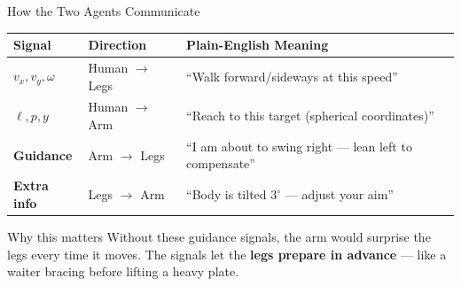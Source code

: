 \documentclass[10pt,aspectratio=169]{beamer}
\newenvironment{keybox}[1][Key Insight]{%
  \begin{exampleblock}{#1}}{\end{exampleblock}}
\begin{document}
\begin{frame}{How the Two Agents Communicate}
  \small
  \begin{table}
    \centering
    \begin{tabular}{>{\bfseries}l l p{6.2cm}}
      \toprule
      Signal & Direction & Plain-English Meaning \\
      \midrule
      $v_x, v_y, \omega$ & Human $\to$ Legs &
        ``Walk forward/sideways at this speed'' \\[3pt]
      $\ell, p, y$ & Human $\to$ Arm &
        ``Reach to this target (spherical coordinates)'' \\[3pt]
      Guidance & Arm $\to$ Legs &
        ``I am about to swing right --- lean left to compensate'' \\[3pt]
      Extra info & Legs $\to$ Arm &
        ``Body is tilted $3^{\circ}$ --- adjust your aim'' \\
      \bottomrule
    \end{tabular}
  \end{table}

  \vspace{4pt}
  \begin{keybox}[Why this matters]
    Without these guidance signals, the arm would surprise the legs
    every time it moves. The signals let the \textbf{legs prepare
    in advance} --- like a waiter bracing before lifting a heavy plate.
  \end{keybox}
\end{frame}
\end{document}
